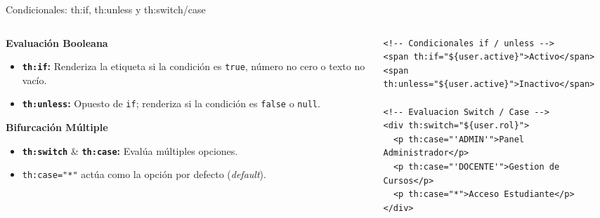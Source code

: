 \documentclass[aspectratio=169]{beamer}
\begin{document}
\begin{frame}[fragile]{Condicionales: th:if, th:unless y th:switch/case}
\begin{columns}[T]
\begin{column}{0.48\textwidth}
  \textbf{Evaluaci\'on Booleana}
  \begin{itemize}
    \item \textbf{\texttt{th:if}:} Renderiza la etiqueta si la condici\'on es \texttt{true}, n\'umero no cero o texto no vac\'io.
    \item \textbf{\texttt{th:unless}:} Opuesto de \texttt{if}; renderiza si la condici\'on es \texttt{false} o \texttt{null}.
  \end{itemize}
  \vspace{4pt}
  \textbf{Bifurcaci\'on M\'ultiple}
  \begin{itemize}
    \item \textbf{\texttt{th:switch}} \& \textbf{\texttt{th:case}:} Eval\'ua m\'ultiples opciones.
    \item \texttt{th:case="*"} act\'ua como la opci\'on por defecto (\textit{default}).
  \end{itemize}
\end{column}
\begin{column}{0.50\textwidth}
\begin{lstlisting}[style=ThymeleafStyle]
<!-- Condicionales if / unless -->
<span th:if="${user.active}">Activo</span>
<span th:unless="${user.active}">Inactivo</span>

<!-- Evaluacion Switch / Case -->
<div th:switch="${user.rol}">
  <p th:case="'ADMIN'">Panel Administrador</p>
  <p th:case="'DOCENTE'">Gestion de Cursos</p>
  <p th:case="*">Acceso Estudiante</p>
</div>
\end{lstlisting}
\end{column}
\end{columns}
\end{frame}
\end{document}
